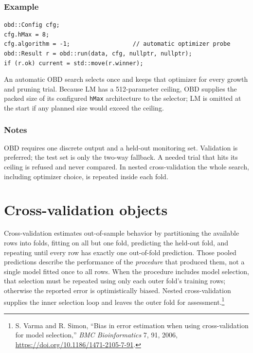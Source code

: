 \subsubsection{Example}
\begin{verbatim}
obd::Config cfg;
cfg.hMax = 8;
cfg.algorithm = -1;                  // automatic optimizer probe
obd::Result r = obd::run(data, cfg, nullptr, nullptr);
if (r.ok) current = std::move(r.winner);
\end{verbatim}

An automatic OBD search selects once and keeps that optimizer for every growth
and pruning trial. Because LM has a 512-parameter ceiling, OBD supplies the
packed size of its configured \texttt{hMax} architecture to the selector; LM is
omitted at the start if any planned size would exceed the ceiling.

\subsubsection{Notes}
OBD requires one discrete output and a held-out monitoring set.  Validation is
preferred; the test set is only the two-way fallback.  A needed trial that hits
its ceiling is refused and never compared.  In nested cross-validation the
whole search, including optimizer choice, is repeated inside each fold.

\section{Cross-validation objects}\label{crossval_objects}

Cross-validation estimates out-of-sample behavior by partitioning the available
rows into folds, fitting on all but one fold, predicting the held-out fold, and
repeating until every row has exactly one out-of-fold prediction.  Those pooled
predictions describe the performance of the \emph{procedure} that produced
them, not a single model fitted once to all rows.  When the procedure includes
model selection, that selection must be repeated using only each outer fold's
training rows; otherwise the reported error is optimistically biased.  Nested
cross-validation supplies the inner selection loop and leaves the outer fold for
assessment.\footnote{S. Varma and R. Simon, ``Bias in error estimation when
using cross-validation for model selection,'' \emph{BMC Bioinformatics} 7, 91,
2006, \url{https://doi.org/10.1186/1471-2105-7-91}.}

